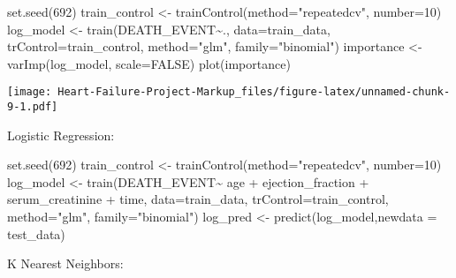 \documentclass[
]{article}
\newenvironment{Shaded}{\begin{snugshade}}{\end{snugshade}}
\newcommand{\AttributeTok}[1]{\textcolor[rgb]{0.77,0.63,0.00}{#1}}
\newcommand{\ConstantTok}[1]{\textcolor[rgb]{0.00,0.00,0.00}{#1}}
\newcommand{\DecValTok}[1]{\textcolor[rgb]{0.00,0.00,0.81}{#1}}
\newcommand{\FunctionTok}[1]{\textcolor[rgb]{0.00,0.00,0.00}{#1}}
\newcommand{\NormalTok}[1]{#1}
\newcommand{\OtherTok}[1]{\textcolor[rgb]{0.56,0.35,0.01}{#1}}
\newcommand{\SpecialCharTok}[1]{\textcolor[rgb]{0.00,0.00,0.00}{#1}}
\newcommand{\StringTok}[1]{\textcolor[rgb]{0.31,0.60,0.02}{#1}}
\begin{document}
\begin{Shaded}
\begin{Highlighting}[]
\FunctionTok{set.seed}\NormalTok{(}\DecValTok{692}\NormalTok{)}
\NormalTok{train\_control }\OtherTok{\textless{}{-}} \FunctionTok{trainControl}\NormalTok{(}\AttributeTok{method=}\StringTok{"repeatedcv"}\NormalTok{, }\AttributeTok{number=}\DecValTok{10}\NormalTok{)}
\NormalTok{log\_model }\OtherTok{\textless{}{-}} \FunctionTok{train}\NormalTok{(DEATH\_EVENT}\SpecialCharTok{\textasciitilde{}}\NormalTok{., }\AttributeTok{data=}\NormalTok{train\_data, }\AttributeTok{trControl=}\NormalTok{train\_control, }\AttributeTok{method=}\StringTok{"glm"}\NormalTok{, }\AttributeTok{family=}\StringTok{"binomial"}\NormalTok{)}
\NormalTok{importance }\OtherTok{\textless{}{-}} \FunctionTok{varImp}\NormalTok{(log\_model, }\AttributeTok{scale=}\ConstantTok{FALSE}\NormalTok{)}
\FunctionTok{plot}\NormalTok{(importance)}
\end{Highlighting}
\end{Shaded}

\texttt{[image: Heart-Failure-Project-Markup\_files/figure-latex/unnamed-chunk-9-1.pdf]}

Logistic Regression:

\begin{Shaded}
\begin{Highlighting}[]
\FunctionTok{set.seed}\NormalTok{(}\DecValTok{692}\NormalTok{)}
\NormalTok{train\_control }\OtherTok{\textless{}{-}} \FunctionTok{trainControl}\NormalTok{(}\AttributeTok{method=}\StringTok{"repeatedcv"}\NormalTok{, }\AttributeTok{number=}\DecValTok{10}\NormalTok{)}
\NormalTok{log\_model }\OtherTok{\textless{}{-}} \FunctionTok{train}\NormalTok{(DEATH\_EVENT}\SpecialCharTok{\textasciitilde{}}\NormalTok{ age }\SpecialCharTok{+}\NormalTok{ ejection\_fraction }\SpecialCharTok{+}\NormalTok{ serum\_creatinine }\SpecialCharTok{+}\NormalTok{ time, }
                   \AttributeTok{data=}\NormalTok{train\_data, }\AttributeTok{trControl=}\NormalTok{train\_control, }\AttributeTok{method=}\StringTok{"glm"}\NormalTok{, }\AttributeTok{family=}\StringTok{"binomial"}\NormalTok{)}
\NormalTok{log\_pred }\OtherTok{\textless{}{-}} \FunctionTok{predict}\NormalTok{(log\_model,}\AttributeTok{newdata =}\NormalTok{ test\_data)}
\end{Highlighting}
\end{Shaded}

K Nearest Neighbors:
\end{document}
